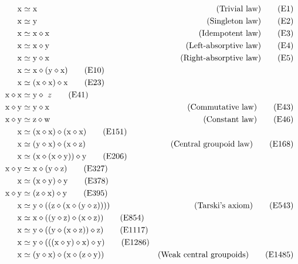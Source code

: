 \begin{align}
        \x &\formaleq \x & \hbox{(Trivial law)} \label{eq1}\tag{E1} \\
        \x &\formaleq \y & \hbox{(Singleton law)} \label{eq2}\tag{E2} \\
        \x &\formaleq \x \op \x & \hbox{(Idempotent law)} \label{eq3}\tag{E3} \\
        \x &\formaleq \x \op \y & \hbox{(Left-absorptive law)} \label{eq4}\tag{E4} \\
        \x &\formaleq \y \op \x & \hbox{(Right-absorptive law)} \label{eq5}\tag{E5} \\
        \x &\formaleq \x \op (\y \op \x) \label{eq10}\tag{E10} \\
        \x &\formaleq (\x \op \x) \op \x \label{eq23}\tag{E23} \\
        \x \op \x &\formaleq \y \op\ z \label{eq41}\tag{E41} \\
        \x \op \y &\formaleq \y \op \x & \hbox{(Commutative law)} \label{eq43}\tag{E43} \\
        \x \op \y &\formaleq \z \op \w & \hbox{(Constant law)} \label{eq46}\tag{E46} \\
        \x &\formaleq (\x \op \x) \op (\x \op \x) \label{eq151}\tag{E151} \\
        \x &\formaleq (\y \op \x) \op (\x \op \z) & \hbox{(Central groupoid law)} \label{eq168}\tag{E168} \\
        \x &\formaleq (\x \op (\x \op \y)) \op \y \label{eq206}\tag{E206} \\
        \x \op \y &\formaleq \x \op (\y \op \z) \label{eq327}\tag{E327} \\
        \x &\formaleq (\x \op \y) \op \y \label{eq378}\tag{E378} \\
        \x \op \y &\formaleq (\z \op \x) \op \y \label{eq395}\tag{E395} \\
        \x &\formaleq \y \op ( (\z \op (\x \op (\y \op \z)))) & \hbox{(Tarski's axiom)} \label{eq543}\tag{E543} \\
        \x &\formaleq \x \op ((\y \op \z) \op (\x \op \z)) \label{eq854}\tag{E854}\\
        \x &\formaleq \y \op ((\y \op (\x \op \z)) \op \z) \label{eq1117}\tag{E1117} \\
        \x &\formaleq \y \op (((\x \op \y) \op \x) \op \y) \label{eq1286}\tag{E1286} \\
        \x &\formaleq (\y \op \x) \op (\x \op (\z \op \y)) & \hbox{(Weak central groupoids)}\label{eq1485}\tag{E1485} \\

\end{align}
